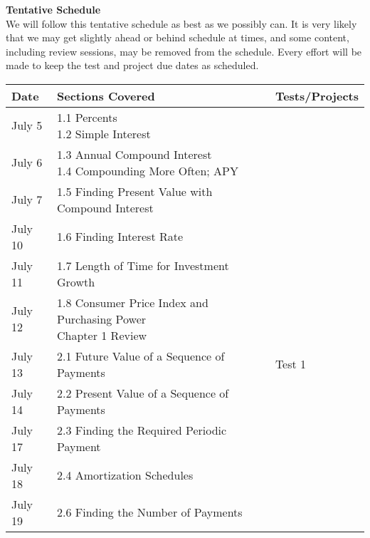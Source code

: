 \documentclass[addpoints,12pt]{exam}
\begin{document}
\noindent \textbf{Tentative Schedule} \\
We will follow this tentative schedule as best as we possibly can. It is very likely that we may get slightly ahead or behind schedule at times, and some content, including review sessions, may be removed from the schedule. Every effort will be made to keep the test and project due dates as scheduled. 
\begin{table}[bht] \sffamily \centering
    \begin{tabular}{|l|l|l|}
    \hline
    \textbf{Date}      & \textbf{Sections Covered}                                                           & \textbf{Tests/Projects} \\ \hline
    July 5    & \parbox[t]{5cm}{1.1 Percents \\ 1.2 Simple Interest   }                                      & ~               \\ \hline
    July 6   & \parbox[t]{8cm}{ 1.3 Annual Compound Interest\\1.4 Compounding More Often; APY}              & ~               \\ \hline
    July 7   & 1.5 Finding Present Value with Compound Interest                           & ~               \\ \hline
    July 10   & 1.6 Finding Interest Rate                                                  & ~               \\ \hline
    July 11   & 1.7 Length of Time for Investment Growth                                   & ~               \\ \hline
    July 12   &  \parbox[t]{9cm}{1.8 Consumer Price Index and Purchasing Power\\Chapter 1 Review}            & ~               \\ \hline
    July 13   & 2.1 Future Value of a Sequence of Payments                                 & Test 1          \\ \hline
    July 14   & 2.2 Present Value of a Sequence of Payments                                & ~               \\ \hline
    July 17   & 2.3 Finding the Required Periodic Payment                                & ~               \\ \hline
    July 18   & 2.4 Amortization Schedules                                                 & ~               \\ \hline
    July 19   &  2.6 Finding the Number of Payments                                & ~               \\ \hline

\end{tabular}
\end{table}
\end{document}
